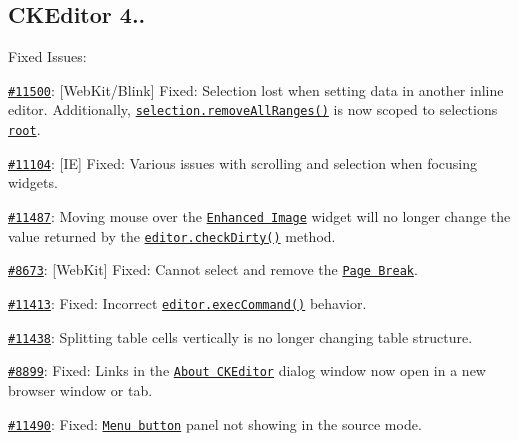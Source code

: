 {\ttfamily \subsection*{C\+K\+Editor 4..}}

{\ttfamily }

{\ttfamily Fixed Issues\+:}

{\ttfamily 
\begin{DoxyItemize}
\item \href{http://dev.ckeditor.com/ticket/11500}{\tt \#11500}\+: \mbox{[}Web\+Kit/\+Blink\mbox{]} Fixed\+: Selection lost when setting data in another inline editor. Additionally, \href{http://docs.ckeditor.com/#!/api/CKEDITOR.dom.selection-method-removeAllRanges}{\tt {\ttfamily selection.\+remove\+All\+Ranges()}} is now scoped to selection\textquotesingle{}s \href{http://docs.ckeditor.com/#!/api/CKEDITOR.dom.selection-property-root}{\tt root}.
\item \href{http://dev.ckeditor.com/ticket/11104}{\tt \#11104}\+: \mbox{[}IE\mbox{]} Fixed\+: Various issues with scrolling and selection when focusing widgets.
\item \href{http://dev.ckeditor.com/ticket/11487}{\tt \#11487}\+: Moving mouse over the \href{http://ckeditor.com/addon/image2}{\tt Enhanced Image} widget will no longer change the value returned by the \href{http://docs.ckeditor.com/#!/api/CKEDITOR.editor-method-checkDirty}{\tt {\ttfamily editor.\+check\+Dirty()}} method.
\item \href{http://dev.ckeditor.com/ticket/8673}{\tt \#8673}\+: \mbox{[}Web\+Kit\mbox{]} Fixed\+: Cannot select and remove the \href{http://ckeditor.com/addon/pagebreak}{\tt Page Break}.
\item \href{http://dev.ckeditor.com/ticket/11413}{\tt \#11413}\+: Fixed\+: Incorrect \href{http://docs.ckeditor.com/#!/api/CKEDITOR.editor-method-execCommand}{\tt {\ttfamily editor.\+exec\+Command()}} behavior.
\item \href{http://dev.ckeditor.com/ticket/11438}{\tt \#11438}\+: Splitting table cells vertically is no longer changing table structure.
\item \href{http://dev.ckeditor.com/ticket/8899}{\tt \#8899}\+: Fixed\+: Links in the \href{http://ckeditor.com/addon/about}{\tt About C\+K\+Editor} dialog window now open in a new browser window or tab.
\item \href{http://dev.ckeditor.com/ticket/11490}{\tt \#11490}\+: Fixed\+: \href{http://ckeditor.com/addon/menubutton}{\tt Menu button} panel not showing in the source mode.

\end{DoxyItemize}}
